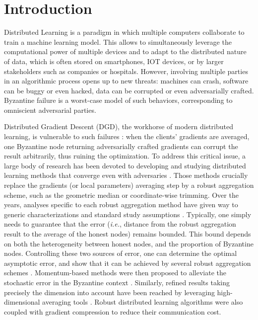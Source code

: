 \documentclass{article}
\newcommand{\renaud}[1]{\todo[bordercolor=BrickRed, textcolor=BrickRed, linecolor=BrickRed]{\textbf{RG:} #1}}
\theoremstyle{plain}
\theoremstyle{definition}
\theoremstyle{remark}
\begin{document}
\section{Introduction}


Distributed Learning is a paradigm in which multiple computers collaborate to train a machine learning model. This allows to simultaneously leverage the computational power of multiple devices and to adapt to the distributed nature of data, which is often stored on smartphones, IOT devices, or by larger stakeholders such as companies or hospitals. However, involving multiple parties in an algorithmic process opens up to new threats: machines can crash, software can be buggy or even hacked, data can be corrupted or even adversarially crafted. Byzantine failure \citep{lamport1982byzantine} is a worst-case model of such behaviors, corresponding to omniscient adversarial parties. 

Distributed Gradient Descent (DGD), the workhorse of modern distributed learning, is vulnerable to such failures \citep{blanchard2017machine}: when the clients' gradients are averaged, one Byzantine node returning adversarially crafted gradients can corrupt the result arbitrarily, thus ruining the optimization. To address this critical issue, a large body of research has been devoted to developing and studying distributed learning methods that converge even with adversaries \citep{blanchard2017machine, yin2018byzantine, chen2017distributed}. Those methods crucially replace the gradients (or local parameters) averaging step by a robust aggregation scheme, such as the geometric median or coordinate-wise trimming. Over the years, analyses specific to each robust aggregation method have given way to generic characterizations and standard study assumptions \citep{allouah2023fixing, karimireddy2020byzantine}. Typically, one simply needs to guarantee that the error (\emph{i.e.}, distance from the robust aggregation result to the average of the honest nodes) remains bounded. \renaud{Je trouve ces deux phrases un peu obscures}This bound depends on both the heterogeneity between honest nodes, and the proportion of Byzantine nodes. Controlling these two sources of error, one can determine the optimal asymptotic error, and show that it can be achieved by several robust aggregation schemes \citep{farhadkhani2022byzantine, karimireddy2021learning}. %
Momentum-based methods were then proposed to alleviate the stochastic error in the Byzantine context \citep{karimireddy2021learning, farhadkhani2022byzantine}. Similarly, refined  results taking precisely the dimension into account have been reached by leveraging high-dimensional averaging tools \citep{diakonikolas2019robust, allouah2025towards}. Robust distributed learning algorithms were also coupled with gradient compression \citep{rammal2024communication, malinovsky2024byzantine, liu2024byzantine} to reduce their communication cost.
\end{document}
